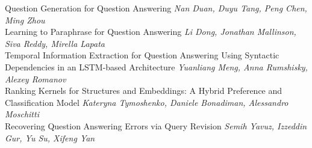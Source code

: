 \documentclass{book}
\begin{document}
    \noindent	Question Generation for Question Answering \newline 
    {\itshape Nan Duan, Duyu Tang, Peng Chen, Ming Zhou} \\
    
    \noindent	Learning to Paraphrase for Question Answering \newline 
    {\itshape Li Dong, Jonathan Mallinson, Siva Reddy, Mirella Lapata} \\
    
    \noindent	Temporal Information Extraction for Question Answering Using Syntactic Dependencies in an LSTM-based Architecture \newline 
    {\itshape Yuanliang Meng, Anna Rumshisky, Alexey Romanov} \\
    
    \noindent	Ranking Kernels for Structures and Embeddings: A Hybrid Preference and Classification Model \newline 
    {\itshape Kateryna Tymoshenko, Daniele Bonadiman, Alessandro Moschitti} \\
    
    \noindent	Recovering Question Answering Errors via Query Revision \newline 
    {\itshape Semih Yavuz, Izzeddin Gur, Yu Su, Xifeng Yan} \\
    
\vspace*{\fill}
\end{document}
